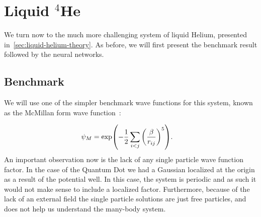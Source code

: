 \documentclass[Thesis.tex]{subfiles}
\begin{document}
\chapter{Liquid $^4$He}
\label{chp:liquid-helium}

We turn now to the much more challenging system of liquid Helium, presented
in~\cref{sec:liquid-helium-theory}. As before, we will first present the
benchmark result followed by the neural networks.


\section{Benchmark}

We will use one of the simpler benchmark wave functions for this system, known
as the McMillan form wave function~\cite{McMillan-1965}:

\begin{align}
  \label{eq:McMillan-wave-function-def}
  \psi_{M} &= \exp(-\frac{1}{2}\sum_{i<j} \qty(\frac{\beta}{r_{ij}})^5).
\end{align}
An important observation now is the lack of any single particle wave function
factor. In the case of the Quantum Dot we had a Gaussian localized at the origin
as a result of the potential well. In this case, the system is periodic and as
such it would not make sense to include a localized factor. Furthermore, because
of the lack of an external field the single particle solutions are just free
particles, and does not help us understand the many-body system.
\end{document}
